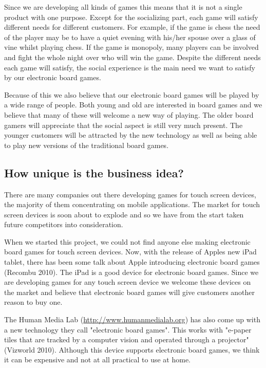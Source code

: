 \documentclass[12pt,a4paper]{article}
\begin{document}
Since we are developing all kinds of games this means that it is not a single product with one purpose. Except for the socializing part, each game will satisfy different needs for different customers. For example, if the game is chess the need of the player may be to have a quiet evening with his/her spouse over a glass of vine whilst playing chess. If the game is monopoly, many players can be involved and fight the whole night over who will win the game. Despite the different needs each game will satisfy, the social experience is the main need we want to satisfy by our electronic board games.

Because of this we also believe that our electronic board games will be played by a wide range of people. Both young and old are interested in board games and we believe that many of these will welcome a new way of playing. The older board gamers will appreciate that the social aspect is still very much present. The younger customers will be attracted by the new technology as well as being able to play new versions of the traditional board games.

\subsection{How unique is the business idea?}
There are many companies out there developing games for touch screen devices, the majority of them concentrating on mobile applications. The market for touch screen devices is soon about to explode and so we have from the start taken future competitors into consideration.

When we started this project, we could not find anyone else making electronic board games for touch screen devices. Now, with the release of Apples new iPad tablet, there has been some talk about Apple introducing electronic board games (Recombu 2010). The iPad is a good device for electronic board games. Since we are developing games for any touch screen device we welcome these devices on the market and believe that electronic board games will give customers another reason to buy one.

The Human Media Lab (\url{http://www.humanmedialab.org}) has also come up with a new technology they call "electronic board games". This works with "e-paper tiles that are tracked by a computer vision and operated through a projector" (Vizworld 2010). Although this device supports electronic board games, we think it can be expensive and not at all practical to use at home.
\end{document}
